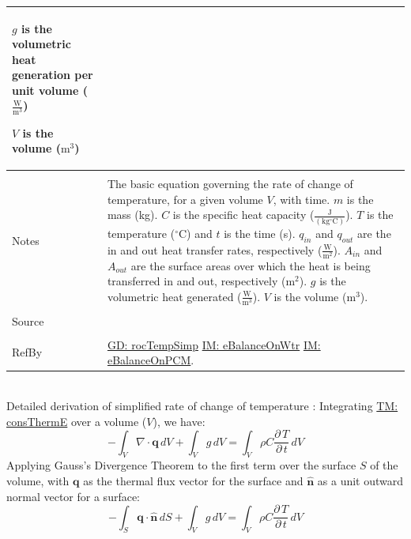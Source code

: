 \documentclass[12pt]{article}
\begin{document}
\begin{minipage}{\textwidth}
\begin{tabular}{p{} p{}}
\begin{symbDescription}
                                 \item{$g$ is the volumetric heat generation per unit volume ($\frac{\text{W}}{\text{m}^{3}}$)}
                                 \item{$V$ is the volume ($\text{m}^{3}$)}
                                 \end{symbDescription}
                                 \\ \midrule \\
                                 Notes & The basic equation governing the rate of change of temperature, for a given volume $V$, with time. $m$ is the mass (kg). $C$ is the specific heat capacity ($\frac{\text{J}}{(\text{kg}{}^{\circ}\text{C})}$). $T$ is the temperature (${}^{\circ}$C) and $t$ is the time (s). ${q_{in}}$ and ${q_{out}}$ are the in and out heat transfer rates, respectively ($\frac{\text{W}}{\text{m}^{2}}$). ${A_{in}}$ and ${A_{out}}$ are the surface areas over which the heat is being transferred in and out, respectively ($\text{m}^{2}$). $g$ is the volumetric heat generated ($\frac{\text{W}}{\text{m}^{3}}$). $V$ is the volume ($\text{m}^{3}$).
                                         \\ \midrule \\
                                         Source & \\ \midrule \\
                                                  RefBy & \hyperref[GD:rocTempSimp]{GD: rocTempSimp} \hyperref[IM:eBalanceOnWtr]{IM: eBalanceOnWtr} \hyperref[IM:eBalanceOnPCM]{IM: eBalanceOnPCM}.
\\ \bottomrule \end{tabular}
\end{minipage}\\
Detailed derivation of simplified rate of change of temperature :
Integrating \hyperref[TM:consThermE]{TM: consThermE} over a volume ($V$), we have:
\begin{dmath}
-\int_{V}{∇\cdot{}\mathbf{q}}\,dV+\int_{V}{g}\,dV=\int_{V}{ρ C \frac{\partial{}\,T}{\partial{}\,t}}\,dV
\end{dmath}
Applying Gauss's Divergence Theorem to the first term over the surface $S$ of the volume, with $\mathbf{q}$ as the thermal flux vector for the surface and $\mathbf{\hat{n}}$ as a unit outward normal vector for a surface:
\begin{dmath}
-\int_{S}{\mathbf{q}\cdot{}\mathbf{\hat{n}}}\,dS+\int_{V}{g}\,dV=\int_{V}{ρ C \frac{\partial{}\,T}{\partial{}\,t}}\,dV
\end{dmath}
\end{document}
